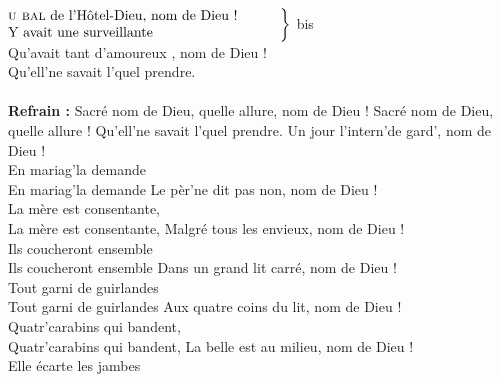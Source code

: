 
\\
$\left.\begin{tabular}{l}
\hspace{-0.4cm}
\textsc{u bal}  de l'Hôtel-Dieu, nom de Dieu ! ~~~~~~
\\
\hspace{-0.4cm}
Y avait une surveillante  ~~~~~
\end{tabular}\right\rbrace$ bis
\\Qu'avait tant d'amoureux , nom de Dieu !
\\Qu'ell'ne savait l'quel prendre.
\\\\\textbf{Refrain :}
{Sacré nom de Dieu, quelle allure, nom de Dieu !}
{Sacré nom de Dieu, quelle allure !}
{Qu'ell'ne savait l'quel prendre.}
Un jour l'intern'de gard', nom de Dieu !
\\En mariag'la demande 
\\
{En mariag'la demande }
Le pèr'ne dit pas non, nom de Dieu !
\\La mère est consentante, 
\\
{La mère est consentante,}
Malgré tous les envieux, nom de Dieu !
\\Ils coucheront ensemble 
\\
{Ils coucheront ensemble }
Dans un grand lit carré, nom de Dieu !
\\Tout garni de guirlandes 
\\
{Tout garni de guirlandes}
Aux quatre coins du lit, nom de Dieu !
\\Quatr'carabins qui bandent, 
\\
{Quatr'carabins qui bandent,}
La belle est au milieu, nom de Dieu !
\\Elle écarte les jambes 
\\
